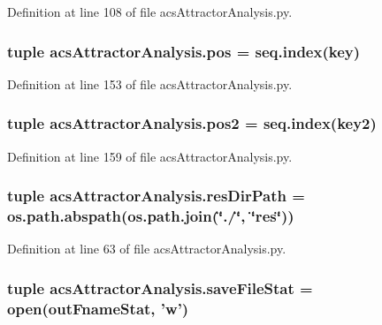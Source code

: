 Definition at line 108 of file acs\-Attractor\-Analysis.\-py.

\hypertarget{a00090_abae060beb170fe923fc10b75f9e82079}{
\subsubsection[{pos}]{\setlength{\rightskip}{0pt plus 5cm}tuple acs\-Attractor\-Analysis.\-pos = {\bf seq.\-index}(key)}}\label{a00090_abae060beb170fe923fc10b75f9e82079}


Definition at line 153 of file acs\-Attractor\-Analysis.\-py.

\hypertarget{a00090_a6ab79d8205f5d0ae2da47fb0af93149a}{
\subsubsection[{pos2}]{\setlength{\rightskip}{0pt plus 5cm}tuple acs\-Attractor\-Analysis.\-pos2 = {\bf seq.\-index}(key2)}}\label{a00090_a6ab79d8205f5d0ae2da47fb0af93149a}


Definition at line 159 of file acs\-Attractor\-Analysis.\-py.

\hypertarget{a00090_a35eb3b681c7408f1476b92798d4f2c16}{
\subsubsection[{res\-Dir\-Path}]{\setlength{\rightskip}{0pt plus 5cm}tuple acs\-Attractor\-Analysis.\-res\-Dir\-Path = os.\-path.\-abspath(os.\-path.\-join(\char`\"{}./\char`\"{}, \char`\"{}res\char`\"{}))}}\label{a00090_a35eb3b681c7408f1476b92798d4f2c16}


Definition at line 63 of file acs\-Attractor\-Analysis.\-py.

\hypertarget{a00090_acc1016f353d0e1b36c837cb0b480edef}{
\subsubsection[{save\-File\-Stat}]{\setlength{\rightskip}{0pt plus 5cm}tuple acs\-Attractor\-Analysis.\-save\-File\-Stat = open({\bf out\-Fname\-Stat}, 'w')}}\label{a00090_acc1016f353d0e1b36c837cb0b480edef}


